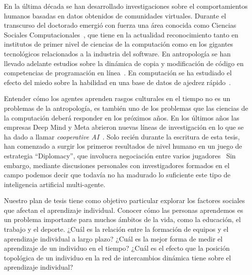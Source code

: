 \documentclass[a4paper,11pt]{book}
\theoremstyle{definition}
\begin{document}

En la última década se han desarrollado investigaciones sobre el comportamientos humanos basadas en datos obtenidos de comunidades virtuales.
%
Durante el transcurso del doctorado emergió con fuerza una área conocida como Ciencias Sociales Computacionales~\cite{lazer2009-computationalSocialScience, lazer2020-computationalSocialScience}, que tiene en la actualidad reconocimiento tanto en institutos de primer nivel de ciencias de la computación como en los gigantes tecnológicos relacionados a la industria del software.
%
En antropología se han llevado adelante estudios sobre la dinámica de copia y modificación de código en competencias de programación en línea~\cite{miu2018-cumulativeCultureOnlineProgrammingContests}.
%
En computación se ha estudiado el efecto del miedo sobre la habilidad en una base de datos de ajedrez rápido~\cite{slezak2012-doNotFearYourOpponent}.


Entender cómo los agentes aprenden rasgos culturales en el tiempo no es un problemas de la antropología, es también uno de los problemas que las ciencias de la computación deberá responder en los próximos años.
%
En los últimos años las empresas Deep Mind y Meta abrieron nuevas líneas de investigación en lo que se ha dado a llamar \emph{cooperative AI}~\cite{dafoe2020-coopAI, dafoe2021-coopAIcomment}.
%
Solo recién durante la escritura de esta tesis, han comenzado a surgir los primeros resultados de nivel humano en un juego de estrategia ``Diplomacy'', que involucra negociación entre varios jugadores~\cite{kramar2022-deepMindDiplomacy, meta2022-diplomacy}
%
Sin embargo, mediante discusiones personales con investigadores formados en el campo podemos decir que todavía no ha madurado lo suficiente este tipo de inteligencia artificial multi-agente.


Nuestro plan de tesis tiene como objetivo particular explorar los factores sociales que afectan el aprendizaje individual.
%
Conocer cómo las personas aprendemos es un problema importante para muchos ámbitos de la vida, como la educación, el trabajo y el deporte.
%
¿Cuál es la relación entre la formación de equipos y el aprendizaje individual a largo plazo?
%
¿Cuál es la mejor forma de medir el aprendizaje de un individuo en el tiempo?
%
¿Cuál es el efecto que la posición topológica de un individuo en la red de intercambios dinámica tiene sobre el aprendizaje individual?

\end{document}
